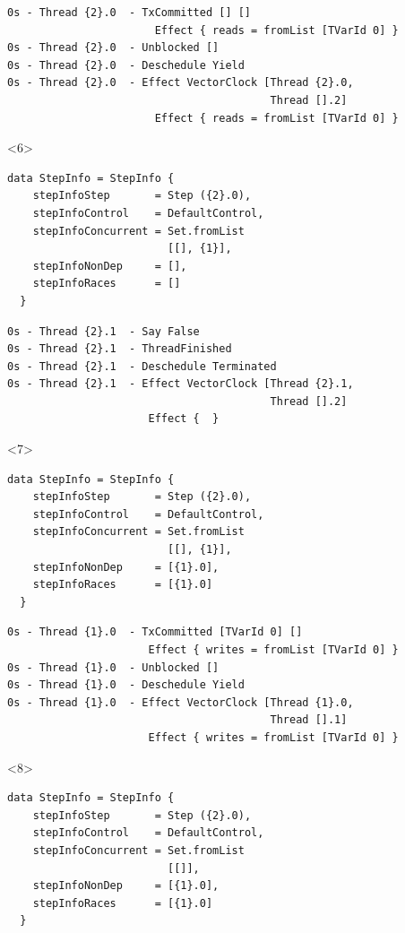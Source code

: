 \documentclass[t,x11names,xcolor={x11names},hyperref={colorlinks,citecolor=Blue4,linkcolor=Blue4,anchorcolor=Blue4,urlcolor=Blue4}]{beamer}
\begin{document}
\begin{frame}[fragile]
\begin{columns}
\begin{column}{0.6\textwidth}
\begin{onlyenv}
\begin{verbatim}
        \end{verbatim}
        \begin{verbatim}
0s - Thread {2}.0  - TxCommitted [] []
                       Effect { reads = fromList [TVarId 0] }
0s - Thread {2}.0  - Unblocked []
0s - Thread {2}.0  - Deschedule Yield
0s - Thread {2}.0  - Effect VectorClock [Thread {2}.0,
                                         Thread [].2]
                       Effect { reads = fromList [TVarId 0] }
        \end{verbatim}
      \end{onlyenv}
      \begin{onlyenv}<6>
        \tiny
        \begin{verbatim}
data StepInfo = StepInfo {
    stepInfoStep       = Step ({2}.0),
    stepInfoControl    = DefaultControl,
    stepInfoConcurrent = Set.fromList
                         [[], {1}],
    stepInfoNonDep     = [],
    stepInfoRaces      = []
  }

        \end{verbatim}
        \begin{verbatim}
0s - Thread {2}.1  - Say False
0s - Thread {2}.1  - ThreadFinished
0s - Thread {2}.1  - Deschedule Terminated
0s - Thread {2}.1  - Effect VectorClock [Thread {2}.1,
                                         Thread [].2]
                      Effect {  }
        \end{verbatim}
      \end{onlyenv}
      \begin{onlyenv}<7>
        \tiny
        \begin{verbatim}
data StepInfo = StepInfo {
    stepInfoStep       = Step ({2}.0),
    stepInfoControl    = DefaultControl,
    stepInfoConcurrent = Set.fromList
                         [[], {1}],
    stepInfoNonDep     = [{1}.0],
    stepInfoRaces      = [{1}.0]
  }

        \end{verbatim}
        \begin{verbatim}
0s - Thread {1}.0  - TxCommitted [TVarId 0] []
                      Effect { writes = fromList [TVarId 0] }
0s - Thread {1}.0  - Unblocked []
0s - Thread {1}.0  - Deschedule Yield
0s - Thread {1}.0  - Effect VectorClock [Thread {1}.0,
                                         Thread [].1]
                      Effect { writes = fromList [TVarId 0] }
        \end{verbatim}
      \end{onlyenv}
      \begin{onlyenv}<8>
        \tiny
        \begin{verbatim}
data StepInfo = StepInfo {
    stepInfoStep       = Step ({2}.0),
    stepInfoControl    = DefaultControl,
    stepInfoConcurrent = Set.fromList
                         [[]],
    stepInfoNonDep     = [{1}.0],
    stepInfoRaces      = [{1}.0]
  }


\end{verbatim}
\end{onlyenv}
\end{column}
\end{columns}
\end{frame}
\end{document}

